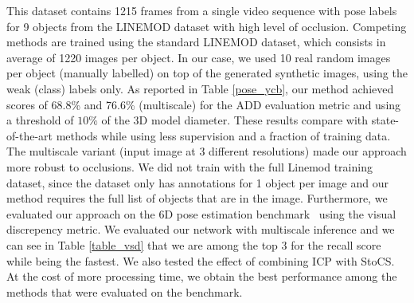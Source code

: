 \documentclass[letterpaper, 10 pt, conference]{ieeeconf}  %
\begin{document}
This dataset contains 1215 frames from a single video sequence with pose labels for 9 objects from the LINEMOD dataset with high level of occlusion. Competing methods are trained using the standard LINEMOD dataset, which consists in average of 1220 images per object. In our case, we used 10 real random images per object (manually labelled) on top of the generated synthetic images, using the weak (class) labels only.
As reported in Table \ref{pose_ycb}, our method achieved scores of 68.8\% and 76.6\% (multiscale) for the ADD evaluation metric and using a threshold of $10\%$ of the 3D model diameter.
These results compare with state-of-the-art methods while using less supervision and a fraction of training data. The multiscale variant (input image at 3 different resolutions) made our approach more robust to occlusions. We did not train with the full Linemod training dataset, since the dataset only has annotations for 1 object per image and our method requires the full list of objects that are in the image. Furthermore, we evaluated our approach on the 6D pose estimation benchmark~\cite{hodan2018bop} using the visual discrepency metric. We evaluated our network with multiscale inference and we can see in Table \ref{table_vsd} that we are among the top 3 for the recall score while being the fastest. We also tested the effect of combining ICP with StoCS. At the cost of more processing time, we obtain the best performance among the methods that were evaluated on the benchmark.
\end{document}
